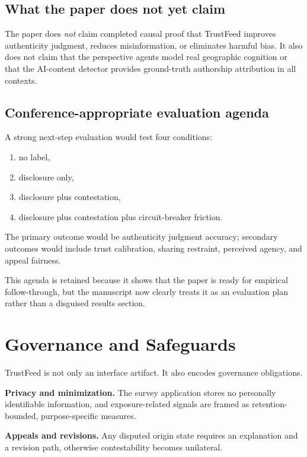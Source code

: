 \documentclass[acmlarge,screen,nonacm]{acmart}
\begin{document}
\subsection{What the paper does not yet claim}

The paper does \emph{not} claim completed causal proof that TrustFeed improves authenticity judgment, reduces misinformation, or eliminates harmful bias. It also does not claim that the perspective agents model real geographic cognition or that the AI-content detector provides ground-truth authorship attribution in all contexts.

\subsection{Conference-appropriate evaluation agenda}

A strong next-step evaluation would test four conditions:
\begin{enumerate}[leftmargin=1.5em]
    \item no label,
    \item disclosure only,
    \item disclosure plus contestation,
    \item disclosure plus contestation plus circuit-breaker friction.
\end{enumerate}
The primary outcome would be authenticity judgment accuracy; secondary outcomes would include trust calibration, sharing restraint, perceived agency, and appeal fairness.

This agenda is retained because it shows that the paper is ready for empirical follow-through, but the manuscript now clearly treats it as an evaluation plan rather than a disguised results section.

\section{Governance and Safeguards}

TrustFeed is not only an interface artifact. It also encodes governance obligations.

\textbf{Privacy and minimization.} The survey application stores no personally identifiable information, and exposure-related signals are framed as retention-bounded, purpose-specific measures.

\textbf{Appeals and revisions.} Any disputed origin state requires an explanation and a revision path, otherwise contestability becomes unilateral.
\end{document}
